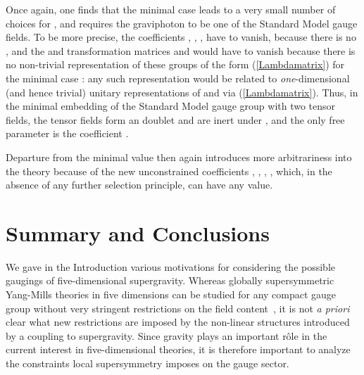 \documentclass[a4paper,11pt]{article}
\providecommand{\M}{\ensuremath{\mathcal{M}}}
\begin{document}
Once again, one finds that the minimal case \coordHE{} leads to a very small 
number of choices for \myHighlight{$\M_{VS}$}\coordHE{}, and requires the graviphoton to be 
one of the Standard Model gauge fields. To be more precise, the 
coefficients \coordHE{}, 
\coordHE{}, \coordHE{}, \coordHE{} have to vanish, because there is no 
\coordHE{}, and the \coordHE{} and \coordHE{} transformation matrices
\coordHE{} and \coordHE{} would have to vanish
because there is no non-trivial representation of these groups of the form 
(\ref{Lambdamatrix}) for the minimal case \coordHE{}: any such representation
would  be related to \emph{one}-dimensional (and hence trivial) 
unitary representations of \coordHE{} and \coordHE{}
via (\ref{Lambdamatrix}).
Thus, in the minimal 
embedding of the Standard Model gauge group with two tensor fields,
the tensor fields form an \coordHE{} doublet and are inert under 
\coordHE{}, and the only free parameter is the coefficient \coordHE{}.

Departure from the minimal
value \coordHE{} then again introduces more arbitrariness into the theory 
because of the new unconstrained coefficients \coordHE{}, 
\coordHE{}, \coordHE{}, \coordHE{}, which, in the absence of any 
further selection principle, can have any value.






\section{Summary and Conclusions}

We gave in the Introduction various motivations for considering the
possible gaugings of five-dimensional \coordHE{} supergravity. 
Whereas globally supersymmetric \coordHE{} Yang-Mills theories in
five dimensions can be studied for any compact gauge group without very
stringent restrictions on the field content~\cite{5Dfieldtheory}, it is
not {\it a priori} clear what new restrictions are imposed by the
non-linear structures introduced by a coupling to supergravity. Since
gravity plays an important r\^{o}le in the current interest in
five-dimensional theories, it is therefore important to analyze the
constraints local supersymmetry imposes on the gauge sector.
\end{document}
